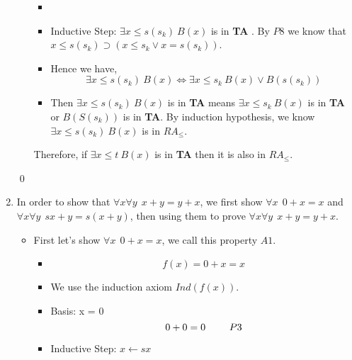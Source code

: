 \documentclass[11pt,twoside]{article}
\begin{document}
\begin{enumerate}[leftmargin=0pt]
\begin{itemize}[label ={}]
\begin{itemize}[label ={}]
				\item
				\item Inductive Step: $\exists x\leq s(s_k) \ B(x)$ is in \textbf{TA} . By $P8$ we know that 
				$x\leq s(s_k)  \supset (x \leq s_k \vee x= s(s_k))$.
				\item Hence we have,
					\[ \exists x\leq s(s_k) \ B(x) \iff  \exists x\leq s_k \ B(x) \vee B(s(s_k)) \]
				\item Then $\exists x\leq s(s_k) \ B(x)$ is in \textbf{TA} means $\exists x\leq s_k \ B(x)$ is in \textbf{TA} or $ B(S(s_k))$ is in \textbf{TA}.
				By induction hypothesis, we know $\exists x\leq s(s_k) \ B(x)$ is in \textbf{$RA_\leq$}. 
			\end{itemize}
		Therefore,  if $\exists x\leq t \ B(x)$ is in \textbf{TA} then it is also in  \textbf{$RA_\leq$}. 
	\end{itemize}
	\qed
\item {}
	In order to show that $\forall x \forall y\ \ x+y = y+x$, we first show $\forall x  \ \ 0+x = x$ and $\forall x \forall y \ \ sx+y = s(x+y)$, then using them to prove $\forall x \forall y \ \ x+y = y+x$.
	\begin{itemize}[label ={}]
	\item  First let's show $\forall x  \ \ 0+x = x$, we call this property $A1$.
			\begin{itemize}[label ={}]
			\item \[ f(x) = 0+x = x\]
			\item We use the induction axiom $Ind(f(x))$.
			\item Basis: x = 0
						\[ 0+0 = 0 \hskip2pc P3 \]
			\item Inductive Step: $x \leftarrow sx$
	

\end{itemize}
\end{itemize}
\end{enumerate}
\end{document}
